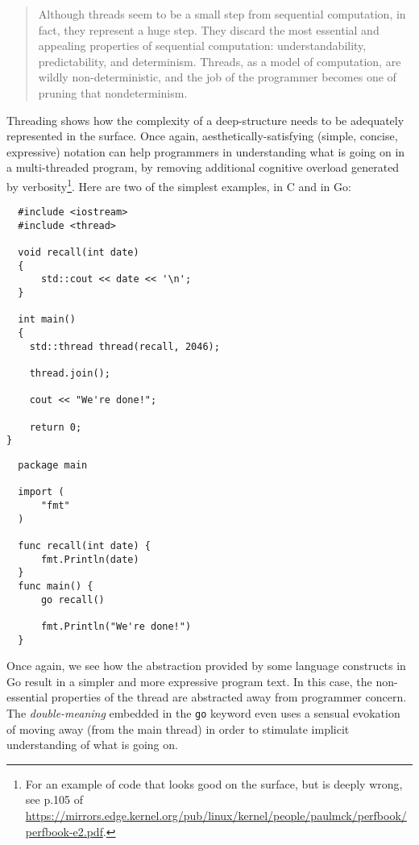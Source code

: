 \begin{quote}
  Although threads seem to be a small step from sequential computation, in fact, they represent a huge step. They discard the most essential and appealing properties of sequential computation: understandability, predictability, and determinism. Threads, as a model of computation, are wildly non-deterministic, and the job of the programmer becomes one of pruning that nondeterminism\citep{lee_problem_2006}.
\end{quote}

Threading shows how the complexity of a deep-structure needs to be adequately represented in the surface. Once again, aesthetically-satisfying (simple, concise, expressive) notation can help programmers in understanding what is going on in a multi-threaded program, by removing additional cognitive overload generated by verbosity\footnote{For an example of code that looks good on the surface, but is deeply wrong, see p.105 of \url{https://mirrors.edge.kernel.org/pub/linux/kernel/people/paulmck/perfbook/perfbook-e2.pdf}.}. Here are two of the simplest examples, in C and in Go:

\begin{lstlisting}
  #include <iostream>
  #include <thread>
  
  void recall(int date)
  {
      std::cout << date << '\n';
  }
  
  int main()
  {
    std::thread thread(recall, 2046);

    thread.join();

    cout << "We're done!";
 
    return 0;
}
\end{lstlisting}

\begin{lstlisting}
  package main

  import (  
      "fmt"
  )

  func recall(int date) {  
      fmt.Println(date)
  }
  func main() {  
      go recall()

      fmt.Println("We're done!")
  }
\end{lstlisting}

Once again, we see how the abstraction provided by some language constructs in Go result in a simpler and more expressive program text. In this case, the non-essential properties of the thread are abstracted away from programmer concern. The \emph{double-meaning} embedded in the \lstinline{go} keyword even uses a sensual evokation of moving away (from the main thread) in order to stimulate implicit understanding of what is going on.

